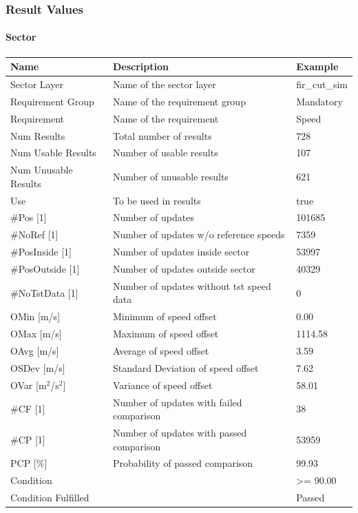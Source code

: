 \subsubsection{Result Values}

\paragraph{Sector}

\begin{center}
 \begin{table}[H]
  \begin{tabularx}{\textwidth}{ | l | X |  l | }
    \hline
    \textbf{Name} & \textbf{Description} & \textbf{Example} \\ \hline
    Sector Layer & Name of the sector layer & fir\_cut\_sim \\ \hline
    Requirement Group & Name of the requirement group & Mandatory \\ \hline
    Requirement & Name of the requirement & Speed \\ \hline
    Num Results & Total number of results & 728 \\ \hline
    Num Usable Results & Number of usable results & 107 \\ \hline
    Num Unusable Results & Number of unusable results & 621 \\ \hline
    Use & To be used in results & true \\ \hline
    \#Pos [1] & Number of updates & 101685 \\ \hline
    \#NoRef [1] & Number of updates w/o reference speeds & 7359 \\ \hline
    \#PosInside [1] & Number of updates inside sector & 53997 \\ \hline
    \#PosOutside [1] & Number of updates outside sector & 40329 \\ \hline
    \#NoTstData [1] & Number of updates without tst speed data & 0 \\ \hline
    OMin [m/s] & Minimum of speed offset & 0.00 \\ \hline
    OMax [m/s] & Maximum of speed offset & 1114.58 \\ \hline
    OAvg [m/s] & Average of speed offset & 3.59 \\ \hline
    OSDev [m/s] & Standard Deviation of speed offset & 7.62 \\ \hline
    OVar [m$^2$/s$^2$] & Variance of speed offset & 58.01 \\ \hline
    \#CF [1] & Number of updates with failed comparison & 38 \\ \hline
    \#CP [1] & Number of updates with passed comparison  & 53959 \\ \hline
    PCP [\%] & Probability of passed comparison & 99.93 \\ \hline
    Condition &  & >= 90.00 \\ \hline
    Condition Fulfilled &  & Passed \\ \hline
\end{tabularx}
\end{table}
\end{center}

